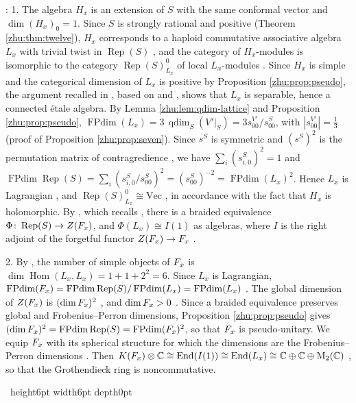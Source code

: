 \documentclass[leqno]{article}
\newcommand{\Cbb}{\ensuremath{\mathbb{C}}}
\newcommand{\M}{\mathrm{M}}
\let\cal\relax
\newcommand{\cal}{\mathcal}
\newcommand{\qed}{\hfill \vrule height6pt  width6pt depth0pt}
\newcommand{\co}{\colon}
\newcommand{\ot}{\otimes}
\DeclareMathOperator{\Rep}{Rep}
\newenvironment{proof}[1][]{\noindent {\it Proof #1} : }{\hbox{~}\qed
\smallskip
}
\numberwithin{equation}{section}
\begin{document}
\begin{proof}
1. The algebra $H_x$ is an extension of $S$ with the same conformal vector and $\dim (H_x)_0 = 1$. Since $S$ is strongly rational and positive (Theorem \ref{zhu:thm:twelve}), $H_x$ corresponds to a haploid commutative associative algebra $L_x$ with trivial twist in $\Rep(S)$ \cite[Theorem 3.2 p.~10]{HKL15}, and the category of $H_x$-modules is isomorphic to the category $\Rep(S)^0_{L_x}$ of local $L_x$-modules \cite[Theorem 3.4 p.~16]{HKL15}. Since $H_x$ is simple and the categorical dimension of $L_x$ is positive by Proposition \ref{zhu:prop:pseudo}, the argument recalled in \cite[Section 2.4]{ArhII}, based on \cite[Lemma 1.20 p.~15 and Theorem 3.3 p.~17]{KiO02} and \cite[Proposition 2.7 p.~5]{DMNO13}, shows that $L_x$ is separable, hence a connected étale algebra. By Lemma \ref{zhu:lem:qdim-lattice} and Proposition \ref{zhu:prop:pseudo}, $\operatorname{FPdim}(L_x) = 3\,\operatorname{qdim}_S(V'|_S) = 3 s^{V'}_{00}/s^S_{00}$, with $|s^{V'}_{00}| = \frac13$ (proof of Proposition \ref{zhu:prop:seven}). Since $s^S$ is symmetric and $(s^S)^2$ is the permutation matrix of contragredience \cite[Theorem 4.1 p.~6452]{DJX13}, we have $\sum_i (s^S_{i,0})^2 = 1$ and $\operatorname{FPdim}\Rep(S) = \sum_i (s^S_{i,0}/s^S_{00})^2 = (s^S_{00})^{-2} = \operatorname{FPdim}(L_x)^2$. Hence $L_x$ is Lagrangian \cite[Definition 4.6 p.~17]{DMNO13}, and $\Rep(S)^0_{L_x} \cong \mathrm{Vec}$ \cite[Remark 4.3 p.~16]{DMNO13}, in accordance with the fact that $H_x$ is holomorphic. By \cite[Proposition 2.2]{ArhII}, which recalls \cite[Corollary 4.1 p.~16]{DMNO13}, there is a braided equivalence $\Phi \co \Rep(S) \to Z(\cal F_x)$, and $\Phi(L_x) \cong I(1)$ as algebras, where $I$ is the right adjoint of the forgetful functor $Z(\cal F_x) \to \cal F_x$ \cite[Lemma 3.1]{ArhII}.

2. By \cite[Lemma 3.1]{ArhII}, the number of simple objects of $\cal F_x$ is $\dim \operatorname{Hom}(L_x,L_x) = 1 + 1 + 2^2 = 6$. Since $L_x$ is Lagrangian, $\operatorname{FPdim}(\cal F_x) = \operatorname{FPdim}\Rep(S)/\operatorname{FPdim}(L_x) = \operatorname{FPdim}(L_x)$ \cite[Lemma 3.11 p.~10]{DMNO13}. The global dimension of $Z(\cal F_x)$ is $(\dim \cal F_x)^2$ \cite[Theorem 2.15]{ENO05}, and $\dim \cal F_x > 0$ \cite[Theorem 2.3]{ENO05}. Since a braided equivalence preserves global and Frobenius--Perron dimensions, Proposition \ref{zhu:prop:pseudo} gives $(\dim \cal F_x)^2 = \operatorname{FPdim}\Rep(S) = \operatorname{FPdim}(\cal F_x)^2$, so that $\cal F_x$ is pseudo-unitary. We equip $\cal F_x$ with its spherical structure for which the dimensions are the Frobenius--Perron dimensions \cite[Proposition 8.23 p.~34]{ENO05}. Then $K(\cal F_x) \ot \Cbb \cong \operatorname{End}(I(1)) \cong \operatorname{End}(L_x) \cong \Cbb \oplus \Cbb \oplus \M_2(\Cbb)$ \cite[Corollary 2.16 p.~7]{Ost15}, so that the Grothendieck ring is noncommutative.


\end{proof}
\end{document}
